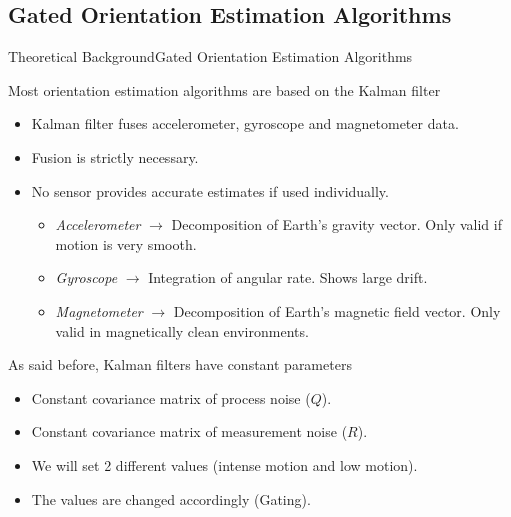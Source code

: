 \documentclass[10pt,aspectratio=1610]{beamer}
\begin{document}
\subsection{Gated Orientation Estimation Algorithms}
\label{subsec:gated_algorithms}
\begin{frame}{Theoretical Background}{Gated Orientation Estimation Algorithms}
\begin{block}{Most orientation estimation algorithms are based on the Kalman filter}
\begin{itemize}
	\item Kalman filter fuses accelerometer, gyroscope and magnetometer data.
	\item Fusion is strictly necessary.
	\item No sensor provides accurate estimates if used individually.
	\begin{itemize}
		\item \textit{Accelerometer} $\rightarrow$ Decomposition of Earth's gravity vector. Only valid if motion is very smooth.
		\item \textit{Gyroscope} $\rightarrow$ Integration of angular rate. Shows large drift.
		\item \textit{Magnetometer} $\rightarrow$ Decomposition of Earth's magnetic field vector. Only valid in magnetically clean environments.
	\end{itemize}
\end{itemize}
\end{block}
\begin{block}{As said before, Kalman filters have constant parameters}
\begin{itemize}
\item Constant covariance matrix of process noise ($Q$).
\item Constant covariance matrix of measurement noise ($R$).
\item We will set 2 different values (intense motion and low motion).
\item The values are changed accordingly (Gating).
\end{itemize}

\end{block}
\end{frame}
\end{document}
